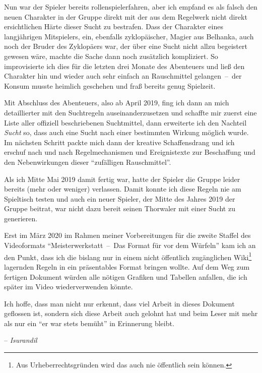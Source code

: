 Nun war der Spieler bereits rollenspielerfahren, aber ich empfand es als falsch den neuen Charakter in der Gruppe direkt mit der aus dem Regelwerk nicht direkt ersichtlichen Härte dieser Sucht zu bestrafen. Dass der Charakter eines langjährigen Mitspielers, ein, ebenfalls zyklopäischer, Magier aus Belhanka, auch noch der Bruder des Zyklopäers war, der über eine Sucht nicht allzu begeistert gewesen wäre, machte die Sache dann noch zusätzlich kompliziert. So improvisierte ich dies für die letzten drei Monate des Abenteuers und ließ den Charakter hin und wieder auch sehr einfach an Rauschmittel gelangen~--~der Konsum musste heimlich geschehen und fraß bereits genug Spielzeit.

Mit Abschluss des Abenteuers, also ab April 2019, fing ich dann an mich detaillierter mit den Suchtregeln auseinanderzusetzen und schaffte mir zuerst eine Liste aller offiziell beschriebenen Suchtmittel, dann erweiterte ich den Nachteil \emph{Sucht} so, dass auch eine Sucht nach einer bestimmten Wirkung möglich wurde. Im nächsten Schritt packte mich dann der kreative Schaffensdrang und ich erschuf nach und nach Regelmechanismen und Ereignistexte zur Beschaffung und den Nebenwirkungen dieser \enquote{zufälligen Rauschmittel}.

Als ich Mitte Mai 2019 damit fertig war, hatte der Spieler die Gruppe leider bereits (mehr oder weniger) verlassen. Damit konnte ich diese Regeln nie am Spieltisch testen und auch ein neuer Spieler, der Mitte des Jahres 2019 der Gruppe beitrat, war nicht dazu bereit seinen Thorwaler mit einer Sucht zu generieren.

Erst im März 2020 im Rahmen meiner Vorbereitungen für die zweite Staffel des Videoformats \enquote{Meisterwerkstatt~--~Das Format für vor dem Würfeln} kam ich an den Punkt, dass ich die bislang nur in einem nicht öffentlich zugänglichen Wiki\footnote{Aus Urheberrechtsgründen wird das auch nie öffentlich sein können.} lagernden Regeln in ein präsentables Format bringen wollte. Auf dem Weg zum fertigen Dokument würden alle nötigen Grafiken und Tabellen anfallen, die ich später im Video wiederverwenden könnte.

Ich hoffe, dass man nicht nur erkennt, dass viel Arbeit in dieses Dokument geflossen ist, sondern sich diese Arbeit auch gelohnt hat und beim Leser mit mehr als nur ein \enquote{er war stets bemüht} in Erinnerung bleibt.

\bigskip\noindent
{\raggedleft-- \emph{Isurandil}\par}


